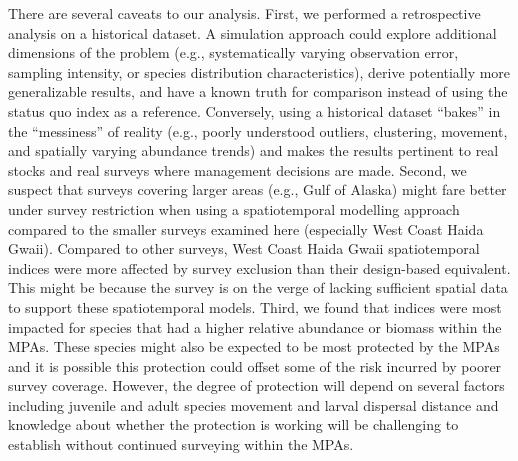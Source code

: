 \documentclass[12pt]{article}
\begin{document}
There are several caveats to our analysis.
First, we performed a retrospective analysis on a historical dataset.
A simulation approach \citep[e.g.,][]{schnute2003, regular2020} could explore additional dimensions of the problem (e.g., systematically varying observation error, sampling intensity, or species distribution characteristics), derive potentially more generalizable results, and have a known truth for comparison instead of using the status quo index as a reference.
Conversely, using a historical dataset ``bakes'' in the ``messiness'' of reality (e.g., poorly understood outliers, clustering, movement, and spatially varying abundance trends) and makes the results pertinent to real stocks and real surveys where management decisions are made.
Second, we suspect that surveys covering larger areas (e.g., Gulf of Alaska) might fare better under survey restriction when using a spatiotemporal modelling approach compared to the smaller surveys examined here (especially West Coast Haida Gwaii).
Compared to other surveys, West Coast Haida Gwaii spatiotemporal indices were more affected by survey exclusion than their design-based equivalent.
This might be because the survey is on the verge of lacking sufficient spatial data to support these spatiotemporal models.
Third, we found that indices were most impacted for species that had a higher relative abundance or biomass within the MPAs.
These species might also be expected to be most protected by the MPAs and it is possible this protection could offset some of the risk incurred by poorer survey coverage.
However, the degree of protection will depend on several factors including juvenile and adult species movement \citep[e.g.,][]{gerber2003, gruss2011} and larval dispersal distance \citep[e.g.,][]{botsford2003, planes2009} and knowledge about whether the protection is working will be challenging to establish without continued surveying within the MPAs.

\end{document}

